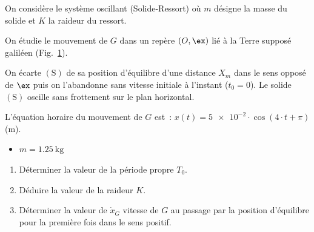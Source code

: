 \begin{minipage}{0.65\linewidth}
    On considère le système oscillant (Solide-Ressort) où $m$ désigne la masse
    du solide et $K$ la raideur du ressort.

    On étudie le mouvement de $G$ dans un repère $(O,\ex)$ lié à la Terre
    supposé galiléen (Fig.~\ref{fig:solide_ressort}).

    On écarte $\mathrm{(S)}$ de sa position d'équilibre d'une distance $X_m$
    dans le
    sens opposé de $\ex$ puis on l'abandonne sans vitesse initiale à l'instant
    ($t_0=0$). Le solide $\mathrm{(S)}$ oscille sans frottement sur le plan
    horizontal.
\end{minipage}
\hfill
\begin{minipage}{0.34\linewidth}
    \begin{figure}[H]
        \centering
        
        \caption{}
        \label{fig:solide_ressort}
    \end{figure}
\end{minipage}

L'équation horaire du mouvement de $G$ est~:
${x(t)=\num{5e-2}\cdot\cos(4\cdot t+\pi)}$ (\unit{\meter}).
\begin{donnees}
    \begin{itemize}
        \item $m=\qty{1.25}{\kg}$
    \end{itemize}
\end{donnees}
\begin{enumerate}
    \item Déterminer la valeur de la période propre $T_0$.
    \item Déduire la valeur de la raideur $K$.
    \item Déterminer la valeur de $\dot{x}_G$ vitesse de $G$ au passage par la
          position d'équilibre pour la première fois dans le sens positif.
\end{enumerate}
